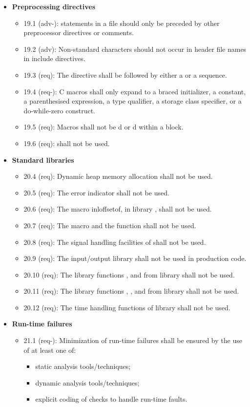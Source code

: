 \begin{itemize}
\begin{itemize}
\end{itemize}
\item \textbf{Preprocessing directives}
\begin{itemize}
\item 19.1 (adv-):  statements in a file should only be preceded by other preprocessor directives or comments.
\item 19.2 (adv): Non-standard characters should not occur in header file names in include directives.
\item 19.3 (req): The  directive shall be followed by either a  or a  sequence.
\item 19.4 (req-): C macros shall only expand to a braced initializer, a constant, a parenthesised expression, a type qualifier, a storage class specifier, or a do-while-zero construct.
\item 19.5 (req): Macros shall not be d or d within a block.
\item 19.6 (req):  shall not be used.
\end{itemize}
\item \textbf{Standard libraries}
\begin{itemize}
\item 20.4 (req): Dynamic heap memory allocation shall not be used.
\item 20.5 (req): The error indicator  shall not be used.
\item 20.6 (req): The macro inl{offsetof}, in library , shall not be used.
\item 20.7 (req): The  macro and the  function shall not be used.
\item 20.8 (req): The signal handling facilities of  shall not be used.
\item 20.9 (req): The input/output library  shall not be used in production code.
\item 20.10 (req): The library functions ,  and  from library  shall not be used.
\item 20.11 (req): The library functions , ,  and  from library  shall not be used.
\item 20.12 (req): The time handling functions of library  shall not be used.
\end{itemize}
\item \textbf{Run-time failures}
\begin{itemize}
\item 21.1 (req-): Minimization of run-time failures shall be ensured by the use of at least one of: 
\begin{itemize}
\item static analysis tools/techniques;
\item dynamic analysis tools/techniques;
\item explicit coding of checks to handle run-time faults.
\end{itemize}
\end{itemize}
\end{itemize}
 
